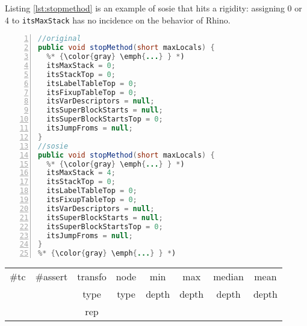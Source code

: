 Listing \ref{lst:stopmethod} is an example of sosie that hits a rigidity: assigning 0 or 4 to \texttt{itsMaxStack} has no incidence on the behavior of Rhino.


\begin{minipage}{\columnwidth}
\begin{lstlisting}[caption={\texttt{stopMethod} in Rhino and a sosie},label={lst:stopmethod},language=java,numbers=left]
//original
public void stopMethod(short maxLocals) {
  %* {\color{gray} \emph{...} } *)
  itsMaxStack = 0;
  itsStackTop = 0;
  itsLabelTableTop = 0;
  itsFixupTableTop = 0;
  itsVarDescriptors = null;
  itsSuperBlockStarts = null;
  itsSuperBlockStartsTop = 0;
  itsJumpFroms = null;
}
//sosie
public void stopMethod(short maxLocals) {
  %* {\color{gray} \emph{...} } *)
  itsMaxStack = 4;
  itsStackTop = 0;
  itsLabelTableTop = 0;
  itsFixupTableTop = 0;
  itsVarDescriptors = null;
  itsSuperBlockStarts = null;
  itsSuperBlockStartsTop = 0;
  itsJumpFroms = null;
}
%* {\color{gray} \emph{...} } *)
\end{lstlisting}
\tabcolsep=0.11cm
\begin{tabular}{>{\small}c>{\small}c>{\small}c>{\small}c>{\small}c>{\small}c>{\small}c>{\small}c}
\hline
\rowcolor{lightgray} \#tc & \#assert & transfo & node & min & max & median & mean   \\
\rowcolor{lightgray}  & & type & type & depth  & depth & depth & depth  \\ 
\hline
&  & rep &  &  &  &  & \\
\hline
\end{tabular}
\end{minipage}